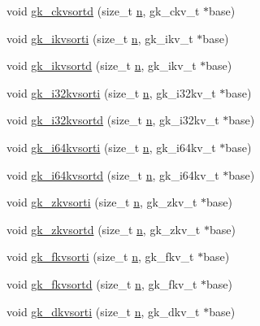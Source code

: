 \begin{DoxyCompactItemize}
\item 
void \hyperlink{a00140_adb7cdf8f8069ea5d9717b43785fd1a6c}{gk\+\_\+ckvsortd} (size\+\_\+t \hyperlink{a00623_a781a04ab095280f838ff3eb0e51312e0}{n}, gk\+\_\+ckv\+\_\+t $\ast$base)
\item 
void \hyperlink{a00140_af0c57772aafc9ec6239683438641c08b}{gk\+\_\+ikvsorti} (size\+\_\+t \hyperlink{a00623_a781a04ab095280f838ff3eb0e51312e0}{n}, gk\+\_\+ikv\+\_\+t $\ast$base)
\item 
void \hyperlink{a00140_a0fde2ad2770975c122bab802cbd5094b}{gk\+\_\+ikvsortd} (size\+\_\+t \hyperlink{a00623_a781a04ab095280f838ff3eb0e51312e0}{n}, gk\+\_\+ikv\+\_\+t $\ast$base)
\item 
void \hyperlink{a00140_a9a939089a3ab9d7ec9fb5e785543f45d}{gk\+\_\+i32kvsorti} (size\+\_\+t \hyperlink{a00623_a781a04ab095280f838ff3eb0e51312e0}{n}, gk\+\_\+i32kv\+\_\+t $\ast$base)
\item 
void \hyperlink{a00140_a0e979cb0725e053df4397f40d02ce23f}{gk\+\_\+i32kvsortd} (size\+\_\+t \hyperlink{a00623_a781a04ab095280f838ff3eb0e51312e0}{n}, gk\+\_\+i32kv\+\_\+t $\ast$base)
\item 
void \hyperlink{a00140_a442355d8561580d45d5a75afb5fb9698}{gk\+\_\+i64kvsorti} (size\+\_\+t \hyperlink{a00623_a781a04ab095280f838ff3eb0e51312e0}{n}, gk\+\_\+i64kv\+\_\+t $\ast$base)
\item 
void \hyperlink{a00140_a7fa957686d304c93a52441fa6fce6652}{gk\+\_\+i64kvsortd} (size\+\_\+t \hyperlink{a00623_a781a04ab095280f838ff3eb0e51312e0}{n}, gk\+\_\+i64kv\+\_\+t $\ast$base)
\item 
void \hyperlink{a00140_a39e869c6f637d2a3cbe92e89f2495d39}{gk\+\_\+zkvsorti} (size\+\_\+t \hyperlink{a00623_a781a04ab095280f838ff3eb0e51312e0}{n}, gk\+\_\+zkv\+\_\+t $\ast$base)
\item 
void \hyperlink{a00140_af837cf83cd77a2232ee7204561d028b1}{gk\+\_\+zkvsortd} (size\+\_\+t \hyperlink{a00623_a781a04ab095280f838ff3eb0e51312e0}{n}, gk\+\_\+zkv\+\_\+t $\ast$base)
\item 
void \hyperlink{a00140_a3cf119da593511faacd54cb35ac8de4e}{gk\+\_\+fkvsorti} (size\+\_\+t \hyperlink{a00623_a781a04ab095280f838ff3eb0e51312e0}{n}, gk\+\_\+fkv\+\_\+t $\ast$base)
\item 
void \hyperlink{a00140_a0b1d86908a6e2acb384bc003e3bc40a0}{gk\+\_\+fkvsortd} (size\+\_\+t \hyperlink{a00623_a781a04ab095280f838ff3eb0e51312e0}{n}, gk\+\_\+fkv\+\_\+t $\ast$base)
\item 
void \hyperlink{a00140_aa7b778397ac67a5f9f61b0eaaec281f7}{gk\+\_\+dkvsorti} (size\+\_\+t \hyperlink{a00623_a781a04ab095280f838ff3eb0e51312e0}{n}, gk\+\_\+dkv\+\_\+t $\ast$base)

\end{DoxyCompactItemize}
